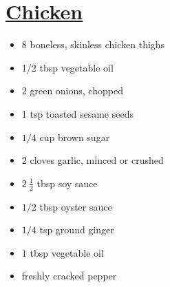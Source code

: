
\RequirePackage{../recipe}






\begin{minipage}{\textwidth}
\vspace{-1em}
\thispagestyle{firstpage}
\section*{\underline{Chicken}}
\ingredients
\vspace{-1em}
\begin{multicols*}{2}
\begin{minipage}{\linewidth}
\ingredients[Chicken]
\vspace{-1em}
\begin{itemize}
    \item 8 boneless, skinless chicken thighs
    \item 1/2 tbsp vegetable oil
\end{itemize}
\end{minipage}

\columnbreak
\begin{minipage}{\linewidth}
\ingredients[Garnish]
\vspace{-1em}
\begin{itemize}
    \item 2 green onions, chopped
    \item 1 tsp toasted sesame seeds
\end{itemize}
\end{minipage}
\end{multicols*}
\vspace{-1em}
\begin{multicols*}{2}
\begin{minipage}{\linewidth}
\ingredients[Marinade]
\vspace{-1em}
\begin{itemize}
    \item $1/4$ cup brown sugar
    \item $2$ cloves garlic, minced or crushed
    \item $2~\frac{1}{2}$ tbsp soy sauce
    \item $1/2$ tbsp oyster sauce
    \item $1/4$ tsp ground ginger
    \item $1$ tbsp vegetable oil
    \item freshly cracked pepper
\end{itemize}
\vspace{1em}
\end{minipage}


\end{multicols*}
\end{minipage}
